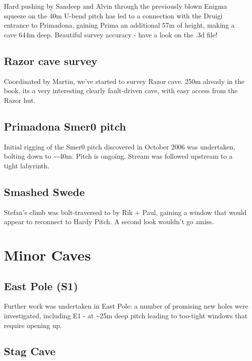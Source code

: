 Hard pushing by Sandeep and Alvin through the previously blown Enigma
squeeze on the 40m U-bend pitch has led to a connection with the Druigi
entrance to Primadona, gaining Prima an additional 57m of height, making
a cave 644m deep. Beautiful survey accuracy - have a look on the .3d
file!

\subsection{Razor cave survey}\label{razor-cave-survey}

Coordinated by Martin, we've started to survey Razor cave. 250m already
in the book, its a very interesting clearly fault-driven cave, with easy
access from the Razor hut.

\subsection{Primadona Smer0 pitch}\label{primadona-smer0-pitch}

Initial rigging of the Smer0 pitch discovered in October 2006 was
undertaken, bolting down to \textasciitilde{}-40m. Pitch is ongoing.
Stream was followed upstream to a tight labyrinth.

\subsection{Smashed Swede}\label{smashed-swede}

Stefan's climb was bolt-traversed to by Rik + Paul, gaining a window
that would appear to reconnect to Hardy Pitch. A second look wouldn't go
amiss.

\section{Minor Caves}\label{minor-caves}

\subsection{East Pole (S1)}\label{east-pole-s1}

Further work was undertaken in East Pole: a number of promising new
holes were investigated, including E1 - at \textasciitilde{}25m deep
pitch leading to too-tight windows that require opening up.

\subsection{Stag Cave}\label{stag-cave}


